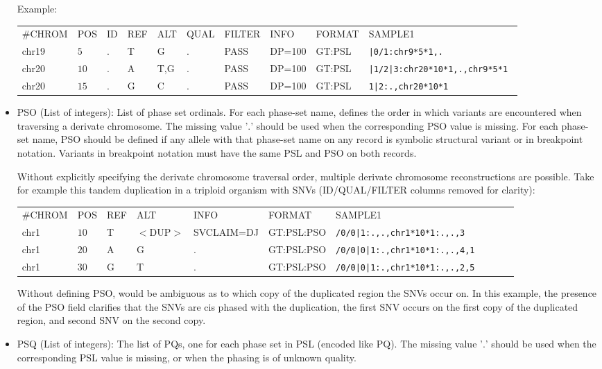 \documentclass[8pt]{article}
\begin{document}
\begin{itemize}
  Example:
  
  \vspace{0.5em}
  \begin{tabular}{ l l l l l l l l l l}
    \#CHROM & POS & ID & REF & ALT & QUAL & FILTER & INFO & FORMAT & SAMPLE1\\
     chr19 & $5$ & . & T & G & . & PASS & DP=100 &GT:PSL & \tt{|0/1:chr9*5*1,.}\\
    chr20 & $10$ & . & A & T,G & . & PASS & DP=100 &GT:PSL & \tt{|1/2|3:chr20*10*1,.,chr9*5*1} \\
    chr20 & $15$ & . & G & C & . & PASS & DP=100 &GT:PSL & \tt{1|2:.,chr20*10*1}\\
  \end{tabular}
  
  \item PSO (List of integers): List of phase set ordinals.
  For each phase-set name, defines the order in which variants are encountered when traversing a derivate chromosome.
  The missing value '$.$' should be used when the corresponding PSO value is missing.
  For each phase-set name, PSO should be defined if any allele with that phase-set name on any record is symbolic structural variant or in breakpoint notation.
  Variants in breakpoint notation must have the same PSL and PSO on both records.
  
  Without explicitly specifying the derivate chromosome traversal order, multiple derivate chromosome reconstructions are possible.
  Take for example this tandem duplication in a triploid organism with SNVs (ID/QUAL/FILTER columns removed for clarity):
  
  \vspace{0.5em}
  \begin{tabular}{ l l l l l l l l l l}
  \#CHROM & POS & REF & ALT & INFO & FORMAT & SAMPLE1\\
    chr1 & $10$ & T & $<$DUP$>$ & SVCLAIM=DJ & GT:PSL:PSO & \tt{/0/0|1:.,.,chr1*10*1:.,.,3}\\
    chr1 & $20$ & A & G & . & GT:PSL:PSO & \tt{/0/0|0|1:.,chr1*10*1:.,.,4,1} \\
    chr1 & $30$ & G & T & . & GT:PSL:PSO & \tt{/0/0|0|1:.,chr1*10*1:.,.,2,5} \\
  \end{tabular}
  
  Without defining PSO, would be ambiguous as to which copy of the duplicated region the SNVs occur on.
  In this example, the presence of the PSO field clarifies that the SNVs are cis phased with the duplication, the first SNV occurs on the first copy of the duplicated region, and second SNV on the second copy.
  
  \item PSQ (List of integers): The list of PQs, one for each phase set in PSL (encoded like PQ). 
  The missing value '$.$' should be used when the corresponding PSL value is missing, or when the phasing is of unknown quality.
\end{itemize}
\end{document}

